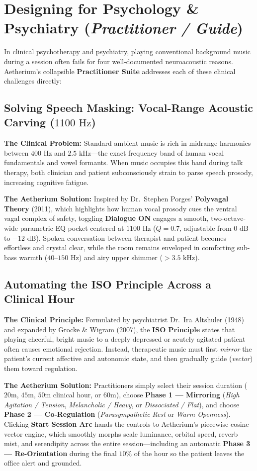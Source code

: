 \documentclass[11pt,oneside,openany]{book}
\begin{document}
\section{Designing for Psychology \& Psychiatry (\textit{Practitioner / Guide})}

In clinical psychotherapy and psychiatry, playing conventional background music during a session often fails for four well-documented neuroacoustic reasons. Aetherium's collapsible \textbf{Practitioner Suite} addresses each of these clinical challenges directly:

\subsection{Solving Speech Masking: Vocal-Range Acoustic Carving ($1100\text{ Hz}$)}
\textbf{The Clinical Problem:} Standard ambient music is rich in midrange harmonics between $400\text{ Hz}$ and $2.5\text{ kHz}$---the exact frequency band of human vocal fundamentals and vowel formants. When music occupies this band during talk therapy, both clinician and patient subconsciously strain to parse speech prosody, increasing cognitive fatigue.

\textbf{The Aetherium Solution:} Inspired by Dr.\ Stephen Porges' \textbf{Polyvagal Theory} (2011), which highlights how human vocal prosody cues the ventral vagal complex of safety, toggling \textbf{Dialogue ON} engages a smooth, two-octave-wide parametric EQ pocket centered at $1100\text{ Hz}$ ($Q = 0.7$, adjustable from $0\text{ dB}$ to $-12\text{ dB}$). Spoken conversation between therapist and patient becomes effortless and crystal clear, while the room remains enveloped in comforting sub-bass warmth ($40\text{--}150\text{ Hz}$) and airy upper shimmer ($>3.5\text{ kHz}$).

\subsection{Automating the ISO Principle Across a Clinical Hour}
\textbf{The Clinical Principle:} Formulated by psychiatrist Dr.\ Ira Altshuler (1948) and expanded by Grocke \& Wigram (2007), the \textbf{ISO Principle} states that playing cheerful, bright music to a deeply depressed or acutely agitated patient often causes emotional rejection. Instead, therapeutic music must first \textit{mirror} the patient's current affective and autonomic state, and then gradually guide (\textit{vector}) them toward regulation.

\textbf{The Aetherium Solution:} Practitioners simply select their session duration ($20\text{m}$, $45\text{m}$, $50\text{m}$ clinical hour, or $60\text{m}$), choose \textbf{Phase 1 --- Mirroring} (\textit{High Agitation / Tension}, \textit{Melancholic / Heavy}, or \textit{Dissociated / Flat}), and choose \textbf{Phase 2 --- Co-Regulation} (\textit{Parasympathetic Rest} or \textit{Warm Openness}). Clicking \textbf{Start Session Arc} hands the controls to Aetherium's piecewise cosine vector engine, which smoothly morphs scale luminance, orbital speed, reverb mist, and serendipity across the entire session---including an automatic \textbf{Phase 3 --- Re-Orientation} during the final $10\%$ of the hour so the patient leaves the office alert and grounded.
\end{document}
